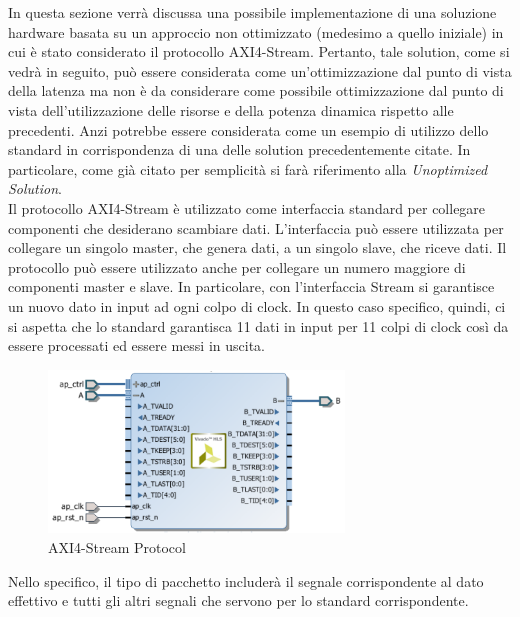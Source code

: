 In questa sezione verrà discussa una possibile implementazione di una soluzione hardware basata su un approccio non ottimizzato (medesimo a quello iniziale) in cui è stato considerato il protocollo AXI4-Stream. Pertanto, tale solution, come si vedrà in seguito, può essere considerata come un'ottimizzazione dal punto di vista della latenza ma non è da considerare come possibile ottimizzazione dal punto di vista dell'utilizzazione delle risorse e della potenza dinamica rispetto alle precedenti. Anzi potrebbe essere considerata come un esempio di utilizzo dello standard in corrispondenza di una delle solution precedentemente citate. In particolare, come già citato per semplicità si farà riferimento alla \textit{Unoptimized Solution}.
\\
Il protocollo AXI4-Stream è utilizzato come interfaccia standard per collegare componenti che desiderano scambiare dati. L'interfaccia può essere utilizzata per collegare un singolo master, che genera dati, a un singolo slave, che riceve dati. Il protocollo può essere utilizzato anche per collegare un numero maggiore di componenti master e slave. In particolare, con l'interfaccia Stream si garantisce un nuovo dato in input ad ogni colpo di clock. In questo caso specifico, quindi, ci si aspetta che lo standard garantisca 11 dati in input per 11 colpi di clock così da essere processati ed essere messi in uscita.

\begin{figure}[H]
	\centering
	\includegraphics[width=0.7\textwidth]{solutions/axi/axistream.png}
	\caption{AXI4-Stream Protocol}
\end{figure}

Nello specifico, il tipo di pacchetto includerà il segnale corrispondente al dato effettivo e tutti gli altri segnali che servono per lo standard corrispondente.




